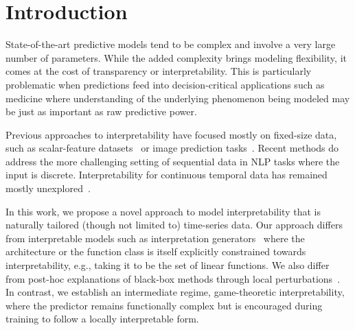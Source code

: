 \section{Introduction}
\label{sec:intro}
State-of-the-art predictive models tend to be complex and involve a very large number of parameters. While the added complexity brings modeling flexibility, it comes at the cost of transparency or interpretability. This is particularly problematic when predictions feed into decision-critical applications such as medicine where understanding of the underlying phenomenon being modeled may be just as important as raw predictive power.

Previous approaches to interpretability have focused mostly on fixed-size data, such as scalar-feature datasets~\cite{lakkaraju2016interpretable} or image prediction tasks~\cite{selvaraju2016grad}. Recent methods do address the more challenging setting of sequential data \cite{Lei2016Rationalizing,arras2017relevant} in NLP tasks where the input is discrete. Interpretability for continuous temporal data has remained mostly unexplored~\cite{wu2018tree}. 


In this work, we propose a novel approach to model interpretability that is naturally tailored (though not limited to) time-series data. 
Our approach differs from interpretable models such as interpretation generators~\cite{al2017contextual,Lei2016Rationalizing} where the architecture or the function class is itself explicitly constrained towards interpretability, e.g., taking it to be the set of linear functions.
We also differ from post-hoc explanations of black-box methods through local perturbations~\cite{Ribeiro2016Why, alvarez2017causal}. In contrast, we establish an intermediate regime, game-theoretic interpretability, where the predictor remains functionally complex but is encouraged during training to follow a locally interpretable form. 

